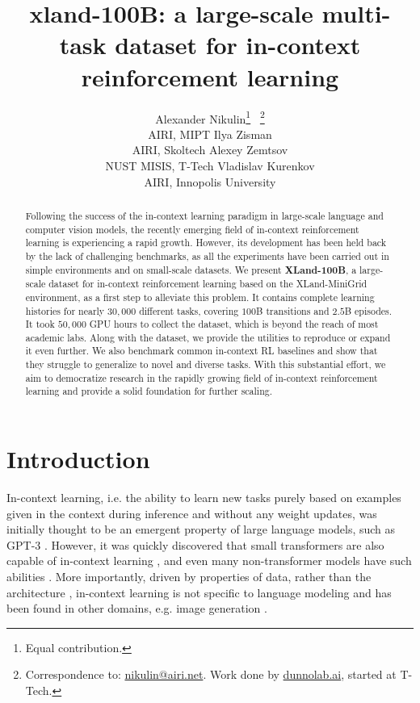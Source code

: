 \documentclass{article}
\title{xland-100B: a large-scale multi-task dataset for in-context reinforcement learning}
\author{
Alexander Nikulin\thanks{Equal contribution.} \ \thanks{Correspondence to: \href{mailto:nikulin@airi.net}{nikulin@airi.net}. Work done by \href{https://dunnolab.ai}{dunnolab.ai}, started at T-Tech.} \\
AIRI, MIPT
\And
Ilya Zisman\footnotemark[1] \\
AIRI, Skoltech
\And
Alexey Zemtsov\footnotemark[1] \\
NUST MISIS, T-Tech
\And
Vladislav Kurenkov \\
AIRI, Innopolis University
}
\begin{document}
\maketitle

\begin{abstract}
Following the success of the in-context learning paradigm in large-scale language and computer vision models, the recently emerging field of in-context reinforcement learning is experiencing a rapid growth. However, its development has been held back by the lack of challenging benchmarks, as all the experiments have been carried out in simple environments and on small-scale datasets. We present \textbf{XLand-100B}, a large-scale dataset for in-context reinforcement learning based on the XLand-MiniGrid environment, as a first step to alleviate this problem. It contains complete learning histories for nearly $30,000$ different tasks, covering $100$B transitions and $2.5$B episodes. It took $50,000$ GPU hours to collect the dataset, which is beyond the reach of most academic labs. Along with the dataset, we provide the utilities to reproduce or expand it even further. We also benchmark common in-context RL baselines and show that they struggle to generalize to novel and diverse tasks. With this substantial effort, we aim to democratize research in the rapidly growing field of in-context reinforcement learning and provide a solid foundation for further scaling. 
\end{abstract}

\section{Introduction}

In-context learning, i.e. the ability to learn new tasks purely based on examples given in the context during inference and without any weight updates, was initially thought to be an emergent property of large language models, such as GPT-3 \citep{brown2020language}. However, it was quickly discovered that small transformers are also capable of in-context learning \citep{kirsch2022general, von2023transformers}, and even many non-transformer models have such abilities \citep{bhattamishra2023understanding, akyurek2024context, park2024can, grazzi2024mamba, vladymyrov2024linear, tong2024mlps}. More importantly, driven by properties of data, rather than the architecture \citep{chan2022data, gu2023pre}, in-context learning is not specific to language modeling and has been found in other domains, e.g. image generation \citep{bai2023sequential, najdenkoska2023context, doveh2024towards, tian2024visual}. 
\end{document}
